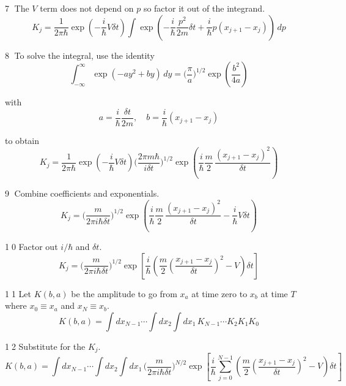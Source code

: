 \textcircled{\scriptsize7}
The $V$ term does not depend on $p$ so factor it out of the integrand.
\begin{equation*}
K_j=\frac{1}{2\pi\hbar}
\exp\left(-\frac{i}{\hbar}V\delta t\right)
\int\exp\left(-\frac{i}{\hbar}
\frac{p^2}{2m}
\delta t
+\frac{i}{\hbar}p(x_{j+1}-x_j)\right)
\,dp
\end{equation*}

\textcircled{\scriptsize8}
To solve the integral, use the identity
\begin{equation*}
\int_{-\infty}^\infty\exp(-ay^2+by)\,dy=\biggl(\frac{\pi}{a}\biggr)^{1/2}
\exp\left(\frac{b^2}{4a}\right)
\end{equation*}

with
\begin{equation*}
a=\frac{i}{\hbar}\frac{\delta t}{2m},\quad b=\frac{i}{\hbar}(x_{j+1}-x_j)
\end{equation*}

to obtain
\begin{equation*}
K_j=\frac{1}{2\pi\hbar}
\exp\left(-\frac{i}{\hbar}V\delta t\right)
\biggl(\frac{2\pi m\hbar}{i\delta t}\biggr)^{1/2}
\exp\left(\frac{i}{\hbar}\frac{m}{2}\,\frac{(x_{j+1}-x_j)^2}{\delta t}\right)
\end{equation*}

\textcircled{\scriptsize9}
Combine coefficients and exponentials.
\begin{equation*}
K_j=\biggl(\frac{m}{2\pi i\hbar\delta t}\biggr)^{1/2}
\exp\left(\frac{i}{\hbar}\frac{m}{2}\,\frac{(x_{j+1}-x_j)^2}{\delta t}-\frac{i}{\hbar}V\delta t\right)
\end{equation*}

\textcircled{\scriptsize10}
Factor out $i/\hbar$ and $\delta t$.
\begin{equation*}
K_j=\biggl(\frac{m}{2\pi i\hbar\delta t}\biggr)^{1/2}
\exp\left[\frac{i}{\hbar}
\left(\frac{m}{2}\left(\frac{x_{j+1}-x_j}{\delta t}\right)^2-V\right)\delta t
\right]
\end{equation*}

\textcircled{\scriptsize11}
Let $K(b,a)$ be the amplitude to go from $x_a$ at time zero to
$x_b$ at time $T$ where $x_0\equiv x_a$ and $x_N\equiv x_b$.
\begin{equation*}
K(b,a)=\int dx_{N-1}\cdots\int dx_2\int dx_1\,
K_{N-1}\cdots K_2K_1K_0
\end{equation*}

\textcircled{\scriptsize12}
Substitute for the $K_j$.
\begin{equation*}
K(b,a)=\int dx_{N-1}\cdots\int dx_2\int dx_1\,
\biggl(\frac{m}{2\pi i\hbar\delta t}\biggr)^{N/2}
\exp\left[
\frac{i}{\hbar}\sum_{j=0}^{N-1}\left(
\frac{m}{2}\left(\frac{x_{j+1}-x_j}{\delta t}\right)^2
-V\right)\delta t
\right]
\end{equation*}

